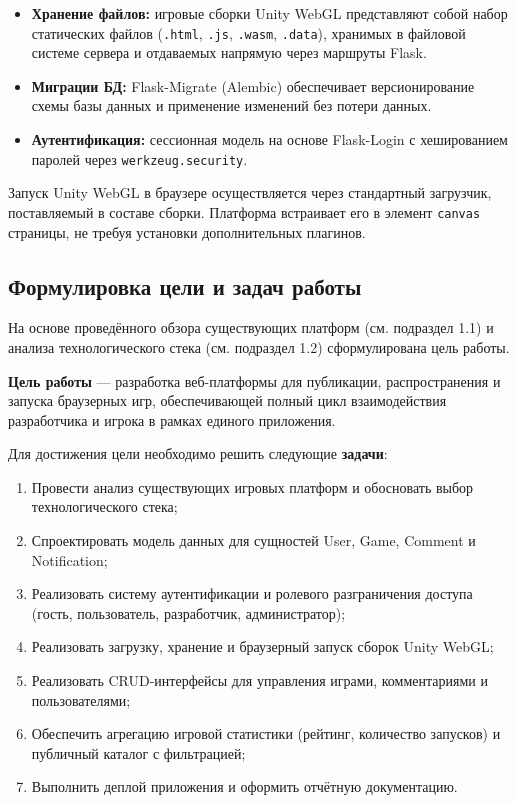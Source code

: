 \begin{itemize}
    \item \textbf{Хранение файлов:} игровые сборки Unity WebGL представляют
          собой набор статических файлов (\texttt{.html}, \texttt{.js},
          \texttt{.wasm}, \texttt{.data}), хранимых в файловой системе сервера
          и отдаваемых напрямую через маршруты Flask.
    \item \textbf{Миграции БД:} Flask-Migrate (Alembic) обеспечивает
          версионирование схемы базы данных и применение изменений без потери
          данных.
    \item \textbf{Аутентификация:} сессионная модель на основе Flask-Login с
          хешированием паролей через \texttt{werkzeug.security}.
\end{itemize}

Запуск Unity WebGL в браузере осуществляется через стандартный загрузчик,
поставляемый в составе сборки. Платформа встраивает его в элемент \texttt{canvas}
страницы, не требуя установки дополнительных плагинов.

\subsection{Формулировка цели и задач работы}

На основе проведённого обзора существующих платформ (см. подраздел 1.1) и
анализа технологического стека (см. подраздел 1.2) сформулирована цель работы.

\textbf{Цель работы} --- разработка веб-платформы для публикации, распространения
и запуска браузерных игр, обеспечивающей полный цикл взаимодействия разработчика
и игрока в рамках единого приложения.

Для достижения цели необходимо решить следующие \textbf{задачи}:
\begin{enumerate}
    \item Провести анализ существующих игровых платформ и обосновать выбор
          технологического стека;
    \item Спроектировать модель данных для сущностей User, Game, Comment и Notification;
    \item Реализовать систему аутентификации и ролевого разграничения доступа
          (гость, пользователь, разработчик, администратор);
    \item Реализовать загрузку, хранение и браузерный запуск сборок Unity WebGL;
    \item Реализовать CRUD-интерфейсы для управления играми, комментариями и
          пользователями;
    \item Обеспечить агрегацию игровой статистики (рейтинг, количество запусков)
          и публичный каталог с фильтрацией;
    \item Выполнить деплой приложения и оформить отчётную документацию.
\end{enumerate}
